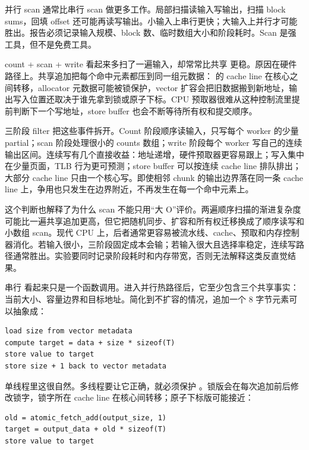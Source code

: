 并行 scan 通常比串行 scan 做更多工作。局部扫描读输入写输出，扫描 block sums，回填 offset 还可能再读写输出。小输入上串行更快；大输入上并行才可能胜出。报告必须记录输入规模、block 数、临时数组大小和阶段耗时。Scan 是强工具，但不是免费工具。

count + scan + write 看起来多扫了一遍输入，却常常比共享  更稳。原因在硬件路径上。共享追加把每个命中元素都压到同一组元数据： 的 cache line 在核心之间转移，allocator 元数据可能被锁保护，vector 扩容会把旧数据搬到新地址，输出写入位置还取决于谁先拿到锁或原子下标。CPU 预取器很难从这种控制流里提前判断下一个写地址，store buffer 也会不断等待所有权和提交顺序。

三阶段 filter 把这些事件拆开。Count 阶段顺序读输入，只写每个 worker 的少量 partial；scan 阶段处理很小的 counts 数组；write 阶段每个 worker 写自己的连续输出区间。连续写有几个直接收益：地址递增，硬件预取器更容易跟上；写入集中在少量页面，TLB 行为更可预测；store buffer 可以按连续 cache line 排队排出；大部分 cache line 只由一个核心写。即使相邻 chunk 的输出边界落在同一条 cache line 上，争用也只发生在边界附近，不再发生在每一个命中元素上。

这个判断也解释了为什么 scan 不能只用“大 O”评价。两遍顺序扫描的渐进复杂度可能比一遍共享追加更高，但它把随机同步、扩容和所有权迁移换成了顺序读写和小数组 scan。现代 CPU 上，后者通常更容易被流水线、cache、预取和内存控制器消化。若输入很小，三阶段固定成本会输；若输入很大且选择率稳定，连续写路径通常胜出。实验要同时记录阶段耗时和内存带宽，否则无法解释这类反直觉结果。

串行  看起来只是一个函数调用。进入并行热路径后，它至少包含三个共享事实：当前大小、容量边界和目标地址。简化到不扩容的情况，追加一个 8 字节元素可以抽象成：

\begin{lstlisting}[numbers=none,caption={不扩容追加的抽象机器动作}]
load size from vector metadata
compute target = data + size * sizeof(T)
store value to target
store size + 1 back to vector metadata
\end{lstlisting}

单线程里这很自然。多线程要让它正确，就必须保护 。锁版会在每次追加前后修改锁字，锁字所在 cache line 在核心间转移；原子下标版可能接近：

\begin{lstlisting}[numbers=none,caption={原子抢输出位置的抽象机器动作}]
old = atomic_fetch_add(output_size, 1)
target = output_data + old * sizeof(T)
store value to target
\end{lstlisting}

